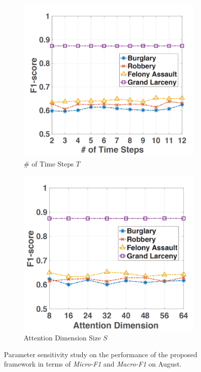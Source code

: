 \begin{figure}[!htb]
    \vspace{0.5cm}

    \begin{subfigure}{0.45\textwidth}
        \centering
        \includegraphics[width=0.9\linewidth]{Chapter5/Images/f1/c.png}
        \caption{\# of Time Steps $T$}
        \label{fig:f13}
    \end{subfigure}
    \begin{subfigure}{0.45\textwidth}
        \centering
        \includegraphics[width=0.9\linewidth]{Chapter5/Images/f1/d.png}
        \caption{Attention Dimension Size $S$}
        \label{fig:f14}
    \end{subfigure}
 
    \caption{Parameter sensitivity study on the performance of
    the proposed framework in terms of \emph{Micro-F1} and \emph{Macro-F1} on August.}
    \label{fig:img4}
\end{figure}

